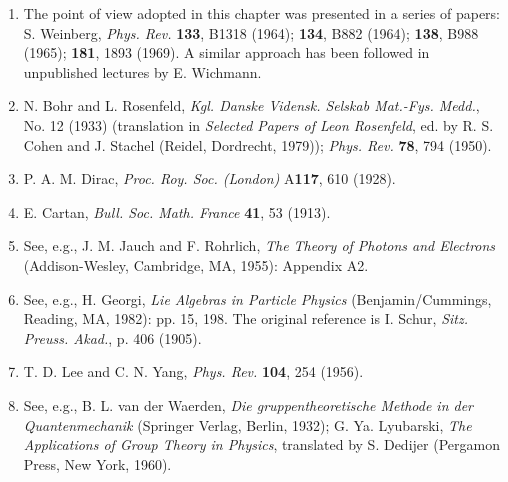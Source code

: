 


\begin{enumerate}
\item\label{ref:5.1} The point of view adopted in this chapter was presented in a series of
papers: S. Weinberg, \emph{Phys. Rev.} \textbf{133}, B1318 (1964);
\textbf{134}, B882 (1964); \textbf{138}, B988 (1965); \textbf{181}, 1893
(1969). A similar approach has been followed in unpublished lectures by
E. Wichmann.

\item\label{ref:5.2} N. Bohr and L. Rosenfeld, \emph{Kgl. Danske Vidensk. Selskab Mat.-Fys.
Medd.}, No. 12 (1933) (translation in \emph{Selected Papers of Leon
Rosenfeld}, ed. by R. S. Cohen and J. Stachel (Reidel, Dordrecht, 1979));
\emph{Phys. Rev.} \textbf{78}, 794 (1950).

\item\label{ref:5.3} P. A. M. Dirac, \emph{Proc. Roy. Soc. (London)} A\textbf{117}, 610
(1928).

\item\label{ref:5.4} E. Cartan, \emph{Bull. Soc. Math. France} \textbf{41}, 53 (1913).

\item\label{ref:5.5} See, e.g., J. M. Jauch and F. Rohrlich, \emph{The Theory of Photons and
Electrons} (Addison-Wesley, Cambridge, MA, 1955): Appendix A2.

\item\label{ref:5.6} See, e.g., H. Georgi, \emph{Lie Algebras in Particle Physics}
(Benjamin/Cummings, Reading, MA, 1982): pp. 15, 198. The original reference
is I. Schur, \emph{Sitz. Preuss. Akad.}, p. 406 (1905).

\item\label{ref:5.7} T. D. Lee and C. N. Yang, \emph{Phys. Rev.} \textbf{104}, 254 (1956).

\item\label{ref:5.8} See, e.g., B. L. van der Waerden, \emph{Die gruppentheoretische Methode
in der Quantenmechanik} (Springer Verlag, Berlin, 1932); G. Ya. Lyubarski,
\emph{The Applications of Group Theory in Physics}, translated by S. Dedijer
(Pergamon Press, New York, 1960).


\end{enumerate}
